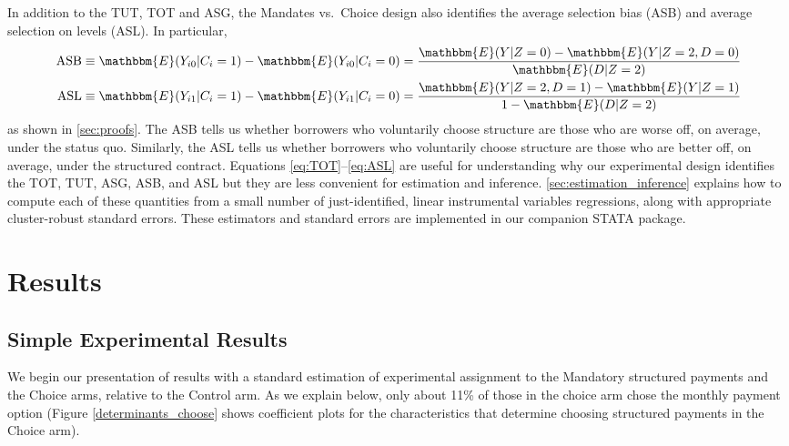\documentclass[12pt, a4paper, colorinlistoftodos]{article}
\begin{document}
In addition to the TUT, TOT and ASG, the Mandates vs.\ Choice design also identifies the average selection bias (ASB) and average selection on levels (ASL). In particular,
\begin{align}
\label{eq:ASB}
    \text{ASB} &\equiv \mathbbm{E}(Y_{i0}|C_i=1) - \mathbbm{E}(Y_{i0}|C_i = 0) = \frac{\mathbbm{E}(Y|Z=0) - \mathbbm{E}(Y|Z=2,D=0)}{\mathbbm{E}(D|Z=2)}\\
    \label{eq:ASL}
    \text{ASL} &\equiv \mathbbm{E}(Y_{i1}|C_i = 1) - \mathbbm{E}(Y_{i1}|C_i=0) = \frac{\mathbbm{E}(Y|Z=2,D=1) - \mathbbm{E}(Y|Z=1)}{1 - \mathbbm{E}(D|Z=2)}
\end{align}
as shown in \autoref{sec:proofs}.
The ASB tells us whether borrowers who voluntarily choose structure are those who are worse off, on average, under the status quo.
Similarly, the ASL tells us whether borrowers who voluntarily choose structure are those who are better off, on average, under the structured contract.
Equations \eqref{eq:TOT}--\eqref{eq:ASL} are useful for understanding why our experimental design identifies the TOT, TUT, ASG, ASB, and ASL but they are less convenient for estimation and inference. 
\autoref{sec:estimation_inference} explains how to compute each of these quantities from a small  number of just-identified, linear instrumental variables regressions, along with appropriate cluster-robust standard errors.
These estimators and standard errors are implemented in our companion STATA package. %


\section{Results} \label{Experiment}



\subsection{Simple Experimental Results}

We begin our presentation of results with a standard estimation of experimental assignment to the Mandatory structured payments and the Choice arms, relative to the Control arm. As we explain below, only about 11\% of those in the choice arm chose the monthly payment option (Figure \ref{determinants_choose} shows coefficient plots for the characteristics that determine choosing structured payments in the Choice arm).
\end{document}
